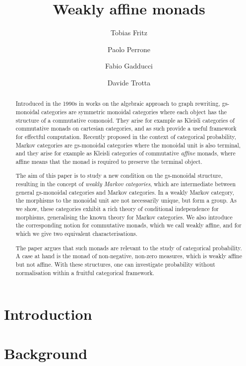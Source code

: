 \documentclass[a4paper,UKenglish,numberwithinsect,cleveref, autoref, thm-restate]{lipics-v2021}
\title{Weakly affine monads}
\author{Tobias Fritz}{Department of Mathematics, University of Innsbruck, AT}{tobias.fritz@uibk.ac.at}{}{}
\author{Paolo Perrone}{Department of Computer Science, University of Oxford, UK}{paolo.perrone@cs.ox.ac.uk}{https://orcid.org/0000-0002-9123-9089}{}
\author{Fabio Gadducci}{Department of Computer Science, University of Pisa, Pisa, IT}{fabio.gadducci@unipi.it}{https://orcid.org/
0000-0003-0690-3051}{}
\author{ Davide Trotta }{Department of Computer Science, University of Pisa, Pisa, IT}{trottadavide92@gmail.com}{https://orcid.org/0000-0003-4509-594X}{}
\theoremstyle{plain} %
\theoremstyle{definition} %
\begin{document}
\maketitle


\begin{abstract}
   Introduced in the 1990s in works on the algebraic approach to graph rewriting, 
   gs-monoidal categories are symmetric monoidal categories 
   where each object has the structure of a commutative comonoid. They arise for example as 
   Kleisli categories of commutative monads on cartesian categories, 
   and as such provide a useful framework for effectful computation. 
   Recently proposed in the context of categorical probability, Markov categories are
   gs-monoidal categories where the monoidal unit is also terminal, and they arise for example as
   Kleisli categories of commutative \emph{affine} monads, where affine means that the monad is required to preserve the terminal object.

   The aim of this paper is to study a new condition on the gs-monoidal structure, resulting in the concept of \emph{weakly Markov categories}, which are intermediate between general 
   gs-monoidal categories and Markov categories. 
   In a weakly Markov category, the morphisms to the monoidal unit are not necessarily unique, but form a group.
   As we show, these categories exhibit a 
   rich theory of conditional independence for morphisms, generalising the known theory for Markov categories. We also introduce the corresponding 
   notion for commutative monads, which we call weakly affine, and for which we give two equivalent
   characterisations.

   The paper argues that such monads are relevant to the study of categorical probability.
   A case at hand is the monad of non-negative, non-zero measures, which is weakly affine but not affine. 
   With these structures, one can investigate probability without normalisation within a fruitful categorical framework.
\end{abstract}

\section{Introduction}

\section{Background}
\end{document}

